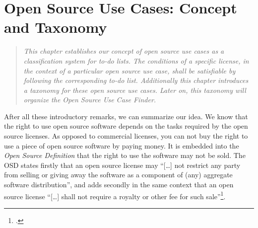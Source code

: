 %
%
%
%
%



\chapter{Open Source Use Cases: Concept and Taxonomy}\label{sec:OSUCdeduction}

\footnotesize \begin{quote}\itshape This chapter establishes our concept of
\emph{open source use cases} as a classification system for to-do lists. The
conditions of a specific license, in the context of a par\-ti\-cu\-lar
\emph{open source use case}, shall be satisfiable by following the corresponding
to-do list. Additionally this chapter introduces a taxonomy for these \emph{open
source use cases}. Later on, this taxonomy will organize the \emph{Open Source
Use Case Finder}.
\end{quote}
\normalsize{}

After all these introductory remarks, we can summarize our idea. We know that
the right to use open source software depends on the tasks required by the open
source licenses. As opposed to commercial licenses, you can not buy the right to
use a piece of open source software by paying money. It is embedded into the
\emph{Open Source Definition} that the right to use the software may not be
sold. The OSD states firstly that an open source license may \enquote{[\ldots]
not restrict any party from selling or giving away the software as a component
of (any) aggregate software distribution}, and adds secondly in the same context
that an open source license \enquote{[\ldots] shall not require a royalty or
other fee for such sale}\footcite[cf.][\nopage wp §1]{OSI2012a}.

